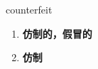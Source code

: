 
\begin{frame}
{\huge counterfeit}
\begin{center}
\begin{enumerate}\Large
  \item \textbf{仿制的，假冒的}
  \item \textbf{仿制}
\end{enumerate}
\end{center}
\end{frame}
